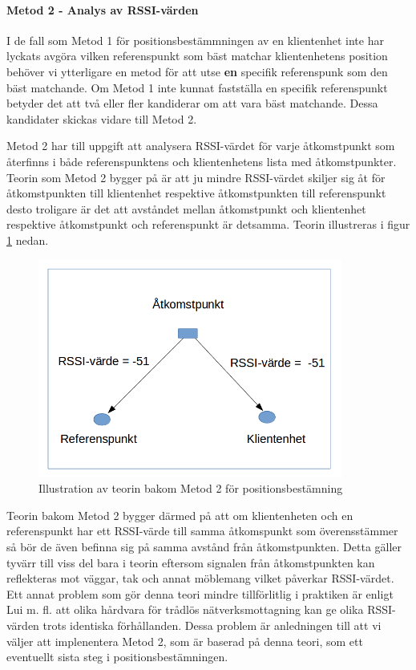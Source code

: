 \documentclass[swedish, a4paper,12pt]{article}
\begin{document}
\paragraph{Metod 2 - Analys av RSSI-värden}
\leavevmode\newline
I de fall som Metod 1 för positionsbestämmningen av en klientenhet inte har lyckats avgöra vilken referenspunkt som bäst matchar klientenhetens position behöver vi ytterligare en metod för att utse \textbf{en} specifik referenspunk som den bäst matchande. Om Metod 1 inte kunnat fastställa en specifik referenspunkt betyder det att två eller fler kandiderar om att vara bäst matchande. Dessa kandidater skickas vidare till Metod 2.

Metod 2 har till uppgift att analysera RSSI-värdet för varje åtkomstpunkt som återfinns i både referenspunktens och klientenhetens lista med åtkomstpunkter.
Teorin som Metod 2 bygger på är att ju mindre RSSI-värdet skiljer sig åt för åtkomstpunkten till klientenhet respektive åtkomstpunkten till referenspunkt desto troligare är det att avståndet mellan åtkomstpunkt och klientenhet respektive åtkomstpunkt och referenspunkt är detsamma. Teorin illustreras i figur \ref{fig:TEO2} nedan.

\begin{figure}[H]
  \centering
  \includegraphics[width=10cm]{media/TeoriMetod2.png}
  \caption{Illustration av teorin bakom Metod 2 för positionsbestämning}
  \label{fig:TEO2}
\end{figure}

Teorin bakom Metod 2 bygger därmed på att om klientenheten och en referenspunkt har ett RSSI-värde till samma åtkomspunkt som överensstämmer så bör de även befinna sig på samma avstånd från åtkomstpunkten. Detta gäller tyvärr till viss del bara i teorin eftersom signalen från åtkomstpunkten kan reflekteras mot väggar, tak och annat möblemang vilket påverkar RSSI-värdet\cite{zanca2008experimental}. Ett annat problem som gör denna teori mindre tillförlitlig i praktiken är enligt Lui m. fl. att olika hårdvara för trådlös nätverksmottagning kan ge olika RSSI-värden trots identiska förhållanden\cite{problem_with_RSSI}. Dessa problem är anledningen till att vi väljer att implenentera Metod 2, som är baserad på denna teori, som ett eventuellt sista steg i positionsbestämningen.
\end{document}
